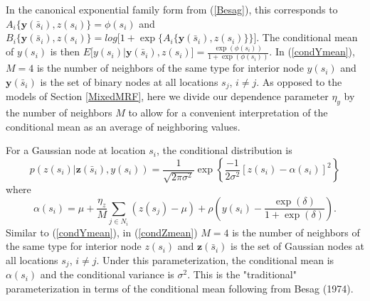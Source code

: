 \documentclass[12pt, a4paper, twoside]{article}
\begin{document}
In the canonical exponential family form from (\ref{Besag}), this corresponds to 
\begin{math}
A_i\lbrace \boldsymbol{y}(\bar{s}_i), z(s_i) \rbrace =  \phi(s_i)
\end{math} and
\begin{math}
B_i\lbrace \boldsymbol{y}(\bar{s}_i), z(s_i) \rbrace = log \lbrack 1+ \exp\lbrace A_i\lbrace \boldsymbol{y}(\bar{s}_i), z(s_i) \rbrace\rbrace\rbrack
\end{math}. The conditional mean of $y(s_i)$ is then $E\lbrack y(s_{i})|\boldsymbol{y}(\bar{s}_i) , z(s_{i})\rbrack=\frac{\exp\left(\phi(s_i)\right)}
{1 + \exp\left(\phi(s_i) \right)}$. In (\ref{condYmean}), $M = 4$ is the number of neighbors of the same type for interior node $y(s_i)$ and $\boldsymbol{y}(\bar{s}_i)$ is the set of binary nodes at all locations $s_j$, $i\neq j$. As opposed to the models of Section \ref{MixedMRF}, here we divide our dependence parameter $\eta_y$ by the number of neighbors $M$ to allow for a convenient interpretation of the conditional mean as an average of neighboring values.

For a Gaussian node at location $s_i$, the conditional distribution is
\begin{equation*}\label{condZ2}
 p(z(s_{i}) | \boldsymbol{z}(\bar{s}_i) , y(s_{i})) = \frac{1}{\sqrt {2 \pi \sigma^2}} \exp\left\lbrace \frac{-1}{2\sigma^2} \left[z(s_i) - \alpha(s_i)  \right]^{2} \right\rbrace 
\end{equation*}
where
\begin{equation*}\label{condZmean2}
\alpha(s_i) =  \mu + \frac{\eta_z}{M} \sum_{j \in N_{i}} \left(z(s_j) - \mu\right)+ \rho\left(y(s_i) - \frac{\exp{(\delta)}}{1+\exp{(\delta)}}\right) .
\end{equation*}
Similar to (\ref{condYmean}), in (\ref{condZmean}) $M = 4$ is the number of neighbors of the same type for interior node $z(s_i)$ and $\boldsymbol{z}(\bar{s}_i)$ is the set of Gaussian nodes at all locations $s_j$, $i\neq j$. Under this parameterization, the conditional mean is $\alpha(s_i)$ and the conditional variance is $\sigma^2$. This is the "traditional" parameterization in terms of the conditional mean following from Besag (1974).
\end{document}
